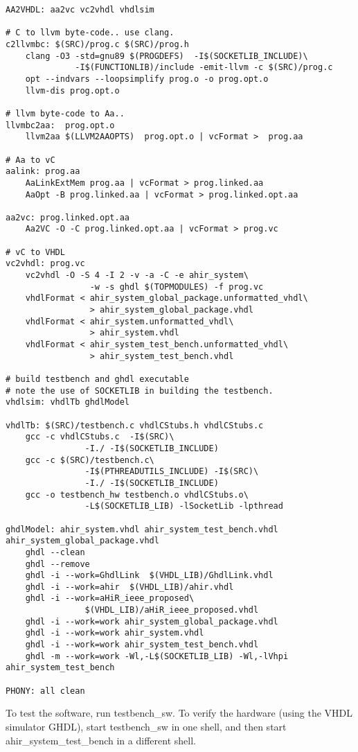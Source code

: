 \documentclass{article}
\begin{document}
\begin{verbatim}
AA2VHDL: aa2vc vc2vhdl vhdlsim

# C to llvm byte-code.. use clang.
c2llvmbc: $(SRC)/prog.c $(SRC)/prog.h
	clang -O3 -std=gnu89 $(PROGDEFS)  -I$(SOCKETLIB_INCLUDE)\
              -I$(FUNCTIONLIB)/include -emit-llvm -c $(SRC)/prog.c
	opt --indvars --loopsimplify prog.o -o prog.opt.o
	llvm-dis prog.opt.o

# llvm byte-code to Aa..
llvmbc2aa:  prog.opt.o 
	llvm2aa $(LLVM2AAOPTS)  prog.opt.o | vcFormat >  prog.aa

# Aa to vC
aalink: prog.aa 
	AaLinkExtMem prog.aa | vcFormat > prog.linked.aa
	AaOpt -B prog.linked.aa | vcFormat > prog.linked.opt.aa

aa2vc: prog.linked.opt.aa
	Aa2VC -O -C prog.linked.opt.aa | vcFormat > prog.vc

# vC to VHDL
vc2vhdl: prog.vc
	vc2vhdl -O -S 4 -I 2 -v -a -C -e ahir_system\
                 -w -s ghdl $(TOPMODULES) -f prog.vc 
	vhdlFormat < ahir_system_global_package.unformatted_vhdl\
                 > ahir_system_global_package.vhdl
	vhdlFormat < ahir_system.unformatted_vhdl\
                 > ahir_system.vhdl
	vhdlFormat < ahir_system_test_bench.unformatted_vhdl\
                 > ahir_system_test_bench.vhdl

# build testbench and ghdl executable
# note the use of SOCKETLIB in building the testbench.
vhdlsim: vhdlTb ghdlModel

vhdlTb: $(SRC)/testbench.c vhdlCStubs.h vhdlCStubs.c
	gcc -c vhdlCStubs.c  -I$(SRC)\
                -I./ -I$(SOCKETLIB_INCLUDE)
	gcc -c $(SRC)/testbench.c\
                -I$(PTHREADUTILS_INCLUDE) -I$(SRC)\
                -I./ -I$(SOCKETLIB_INCLUDE)
	gcc -o testbench_hw testbench.o vhdlCStubs.o\
                -L$(SOCKETLIB_LIB) -lSocketLib -lpthread

ghdlModel: ahir_system.vhdl ahir_system_test_bench.vhdl ahir_system_global_package.vhdl
	ghdl --clean
	ghdl --remove
	ghdl -i --work=GhdlLink  $(VHDL_LIB)/GhdlLink.vhdl
	ghdl -i --work=ahir  $(VHDL_LIB)/ahir.vhdl
	ghdl -i --work=aHiR_ieee_proposed\
                $(VHDL_LIB)/aHiR_ieee_proposed.vhdl
	ghdl -i --work=work ahir_system_global_package.vhdl
	ghdl -i --work=work ahir_system.vhdl
	ghdl -i --work=work ahir_system_test_bench.vhdl
	ghdl -m --work=work -Wl,-L$(SOCKETLIB_LIB) -Wl,-lVhpi ahir_system_test_bench 

PHONY: all clean	
\end{verbatim}
To test the software, run testbench\_sw.  To verify the hardware (using
the VHDL simulator GHDL), start testbench\_sw in one shell, and then start ahir\_system\_test\_bench
in a different shell.
\end{document}
